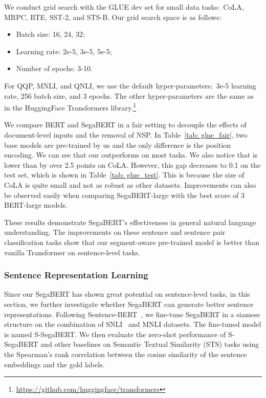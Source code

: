 \documentclass[letterpaper]{article}
\begin{document}
We conduct grid search with the GLUE dev set for small data tasks:\ CoLA, MRPC, RTE, SST-2, and STS-B. 
Our grid search space is as follows: 

\begin{itemize}
    \item Batch size: 16, 24, 32;  
    \item Learning rate: 2e-5, 3e-5, 5e-5; 
    \item Number of epochs: 3-10.
\end{itemize}

For QQP, MNLI, and QNLI, we use the default hyper-parameters:\ 3e-5 learning rate, 256 batch size, and 3 epochs. 
The other hyper-parameters are the same as in the HuggingFace Transformers library.\footnote{\url{https://github.com/huggingface/transformers}} 

We compare BERT and SegaBERT in a fair setting to decouple the effects of document-level inputs and the removal of NSP.
In Table~\ref{tab: glue_fair}, two base models are pre-trained by us and the only difference is the position encoding.
We can see that our  outperforms  on most tasks. 
We also notice that  is lower than  by over 2.5 points on CoLA. 
However, this gap decreases to 0.1 on the test set, which is shown in Table~\ref{tab: glue_test}.
This is because the size of CoLA is quite small and not as robust as other datasets.
Improvements can also be observed easily when comparing SegaBERT-large with the best score of 3 BERT-large models. 

These results demonstrate SegaBERT's effectiveness in general natural language understanding. 
The improvements on these sentence and sentence pair classification tasks show that our segment-aware pre-trained model is better than vanilla Transformer on sentence-level tasks.

\subsubsection{Sentence Representation Learning}
Since our SegaBERT has shown great potential on sentence-level tasks, in this section, we further investigate whether SegaBERT can generate better sentence representations.
Following Sentence-BERT~\citep{DBLP:conf/emnlp/sbert}, we fine-tune SegaBERT in a siamese structure on the combination of SNLI~\cite{DBLP:conf/emnlp/BowmanAPM15} and MNLI datasets. The fine-tuned model is named S-SegaBERT.
We then evaluate the zero-shot performance of S-SegaBERT and other baselines on Semantic Textual Similarity (STS) tasks using the Spearman's rank correlation between the cosine similarity of the sentence embeddings and the gold labels. 
\end{document}
